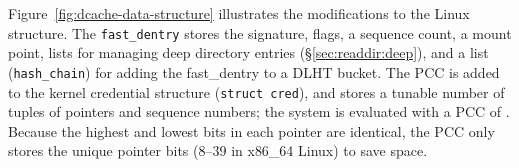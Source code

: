 Figure~\ref{fig:dcache-data-structure} illustrates the modifications 
to the Linux \dentry{} structure.  The {\tt fast\_dentry}
stores the signature, flags, a sequence count, a mount point,
lists for managing deep directory entries (\S\ref{sec:readdir:deep}),
and a list ({\tt hash\_chain}) for adding the fast\_dentry to a DLHT bucket.
The PCC is added to the kernel credential structure ({\tt struct cred}), %
and stores a tunable number of tuples of \dentry{} pointers and sequence numbers;
the system is evaluated with a PCC of \PCCsize{}.
Because the highest and lowest bits in each \dentry{} pointer are identical,
the PCC only stores the unique pointer bits (8--39 in x86\_64 Linux) to save space.








